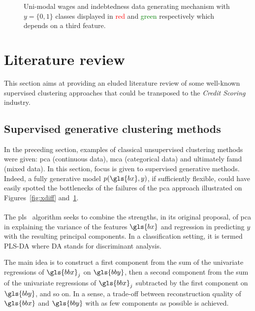 \begin{figure}
\caption{\label{fig:ydiff} Uni-modal wages and indebtedness data generating mechanism with $y = \{0,1\}$ classes displayed in \textcolor{red}{red} and \textcolor{green}{green} respectively which depends on a third feature.}
\end{figure}








\section{Literature review} \label{sec:literature}

This section aims at providing an eluded literature review of some well-known supervised clustering approaches that could be transposed to the \textit{Credit Scoring} industry.

\subsection{Supervised generative clustering methods} \label{subsec:sup_gen}

In the preceding section, examples of classical unsupervised clustering methods were given: \gls{pca} (continuous data), \gls{mca} (categorical data) and ultimately \gls{famd} (mixed data). In this section, focus is given to supervised generative methods. Indeed, a fully generative model $p(\gls{bx},y)$, if sufficiently flexible, could have easily spotted the bottlenecks of the failures of the \gls{pca} approach illustrated on Figures~\ref{fig:xdiff} and~\ref{fig:ydiff}.

\paragraph{}

The \gls{pls}~\cite{wold1984collinearity} algorithm seeks to combine the strengths, in its original proposal, of \gls{pca} in explaining the variance of the features $\gls{bx}$ and regression in predicting $y$ with the resulting principal components. In a classification setting, it is termed PLS-DA where DA stands for discriminant analysis.

The main idea is to construct a first component from the sum of the univariate regressions of $\gls{bbx}_j$ on $\gls{bby}$, then a second component from the sum of the univariate regressions of $\gls{bbx}_j$ subtracted by the first component on $\gls{bby}$, and so on. In a sense, a trade-off between reconstruction quality of $\gls{bbx}$ and $\gls{bby}$ with as few components as possible is achieved.

